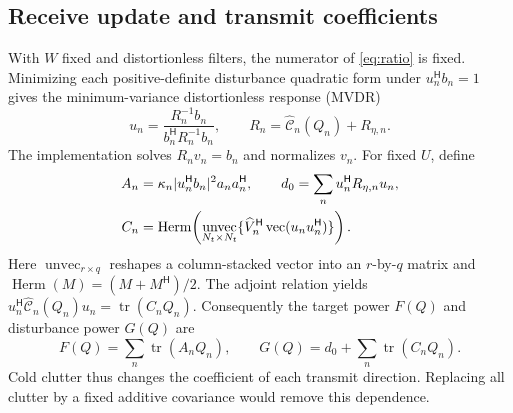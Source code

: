\documentclass[journal]{IEEEtran}
\DeclareMathOperator{\tr}{tr}
\DeclareMathOperator{\vecop}{vec}
\DeclareMathOperator{\unvec}{unvec}
\DeclareMathOperator{\Herm}{Herm}
\newcommand{\Hh}{^{\mathsf H}}
\begin{document}
\subsection{Receive update and transmit coefficients}
With $W$ fixed and distortionless filters, the numerator of \eqref{eq:ratio} is fixed. Minimizing each positive-definite disturbance quadratic form under $u_n\Hh b_n=1$ gives the minimum-variance distortionless response (MVDR)
\begin{equation}
 u_n=\frac{R_n^{-1}b_n}{b_n\Hh R_n^{-1}b_n},\qquad
 R_n=\widehat{\mathcal C}_n(Q_n)+R_{\eta,n}. \label{eq:mvdr}
\end{equation}
The implementation solves $R_nv_n=b_n$ and normalizes $v_n$. For fixed $U$, define
\begin{align}
 A_n&=\kappa_n|u_n\Hh b_n|^2a_na_n\Hh,\qquad
 d_0=\sum_n u_n\Hh R_{\eta,n}u_n,\notag\\
 C_n&=\Herm\!\left(\unvec_{N_t\times N_t}
       \{\widehat V_n\Hh\vecop(u_nu_n\Hh)\}\right).
 \label{eq:coeff}
\end{align}
Here $\unvec_{r\times q}$ reshapes a column-stacked vector into an $r$-by-$q$ matrix and $\Herm(M)=(M+M\Hh)/2$. The adjoint relation yields $u_n\Hh\widehat{\mathcal C}_n(Q_n)u_n=\tr(C_nQ_n)$. Consequently the target power $F(Q)$ and disturbance power $G(Q)$ are
\begin{equation}
 F(Q)=\sum_n\tr(A_nQ_n),\qquad
 G(Q)=d_0+\sum_n\tr(C_nQ_n). \label{eq:fg}
\end{equation}
Cold clutter thus changes the coefficient of each transmit direction. Replacing all clutter by a fixed additive covariance would remove this dependence.
\end{document}

